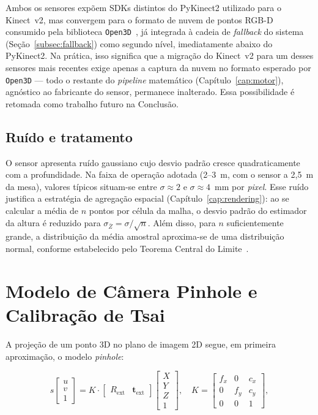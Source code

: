 Ambos os sensores expõem SDKs distintos do PyKinect2 utilizado para o
Kinect~v2, mas convergem para o formato de nuvem de pontos RGB-D
consumido pela biblioteca \texttt{Open3D}~\cite{zhou2018open3d}, já
integrada à cadeia de \textit{fallback} do sistema
(Seção~\ref{subsec:fallback}) como segundo nível, imediatamente abaixo
do PyKinect2. Na prática, isso significa que a migração do Kinect~v2
para um desses sensores mais recentes exige apenas a captura da nuvem no
formato esperado por \texttt{Open3D} — todo o restante do
\textit{pipeline} matemático (Capítulo~\ref{cap:motor}), agnóstico ao
fabricante do sensor, permanece inalterado. Essa possibilidade é
retomada como trabalho futuro na Conclusão.

\subsection{Ruído e tratamento}
\label{subsec:ruido}

O sensor apresenta ruído gaussiano cujo desvio padrão cresce
quadraticamente com a profundidade. Na faixa de operação adotada
(2--3~m, com o sensor a 2,5~m da mesa), valores típicos situam-se
entre $\sigma \approx 2$ e $\sigma \approx 4$~mm por \textit{pixel}.
Esse ruído justifica a estratégia de agregação espacial (Capítulo~\ref{cap:rendering}):
ao se calcular a média de $n$ pontos por célula da malha, o desvio padrão do estimador
da altura é reduzido para $\sigma_{\bar{Z}} = \sigma / \sqrt{n}$. Além disso, para $n$
suficientemente grande, a distribuição da média amostral aproxima-se de
uma distribuição normal, conforme estabelecido pelo Teorema Central do
Limite~\cite{casella2002statistical}.

\section{Modelo de Câmera Pinhole e Calibração de Tsai}
\label{sec:pinhole}

A projeção de um ponto 3D no plano de imagem 2D segue, em primeira
aproximação, o modelo \textit{pinhole}:

\begin{equation}
\label{eq:pinhole}
s
\begin{bmatrix} u \\ v \\ 1 \end{bmatrix}
=
K \cdot
\begin{bmatrix} R_{\text{ext}} & \mathbf{t}_{\text{ext}} \end{bmatrix}
\begin{bmatrix} X \\ Y \\ Z \\ 1 \end{bmatrix},
\quad
K = \begin{bmatrix} f_x & 0 & c_x \\ 0 & f_y & c_y \\ 0 & 0 & 1 \end{bmatrix},
\end{equation}

